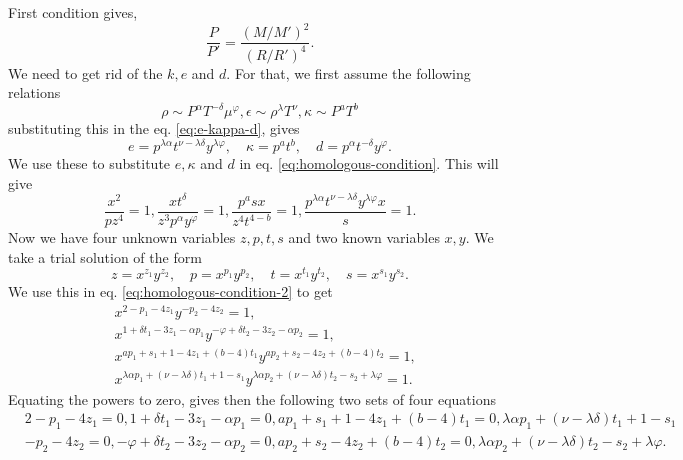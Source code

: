 \documentclass{revtex4-2}
\begin{document}
First condition gives,
\begin{equation}
  \label{eq:pressure}
  \frac{P}{P'} = \frac{(M/M')^2}{(R/R')^4}.
\end{equation}
We need to get rid of the $k, e$ and $d$. For that, we first assume the following relations
\begin{equation}
  \label{eq:micro-physics}
  \rho\sim P^\alpha T^{-\delta}\mu^\varphi, \epsilon \sim \rho^\lambda T^\nu, \kappa \sim P^a T^b
\end{equation}
substituting this in the eq. \eqref{eq:e-kappa-d}, gives
\begin{equation}
  \label{eq:e-kappa-d-2}
  e = p^{\lambda\alpha} t^{\nu-\lambda\delta}y^{\lambda\varphi},\quad \kappa = p^a t^b,\quad d = p^\alpha t^{-\delta}y^\varphi. 
\end{equation}
We use these to substitute $e, \kappa$ and $d$ in eq. \eqref{eq:homologous-condition}. This will give
\begin{equation}
  \label{eq:homologous-condition-2}
  \frac{x^2}{pz^4} = 1, \frac{x t^\delta}{z^3 p^\alpha y^\varphi} = 1, \frac{p^a sx}{z^4 t^{4-b}} = 1, \frac{p^{\lambda\alpha} t^{\nu-\lambda\delta}y^{\lambda\varphi} x}{s} = 1.
\end{equation}
Now we have four unknown variables $z, p, t, s$ and two known variables $x, y$. We take a trial solution of the form
\begin{equation}
  \label{eq:trial}
  z = x^{z_1}y^{z_2},\quad p = x^{p_1}y^{p_2},\quad t = x^{t_1}y^{t_2},\quad s = x^{s_1}y^{s_2}.
\end{equation}
We use this in eq. \eqref{eq:homologous-condition-2} to get
\begin{equation}
  \label{eq:eq-set-1}
  \begin{aligned}
    & x^{2 - p_1 - 4z_1}y^{- p_2 - 4z_2} = 1,\\
    & x^{1 + \delta t_1 - 3 z_1 - \alpha p_1}y^{-\varphi + \delta t_2 - 3 z_2 - \alpha p_2} = 1,\\
    & x^{ap_1 + s_1 + 1 - 4z_1 + (b-4)t_1}y^{ap_2 + s_2 - 4 z_2 + (b-4)t_2} = 1,\\
    & x^{\lambda\alpha p_1 + (\nu-\lambda\delta) t_1 + 1 - s_1}y^{\lambda\alpha p_2 + (\nu-\lambda\delta) t_2 - s_2 + \lambda\varphi} = 1.
\end{aligned}
\end{equation}
Equating the powers to zero, gives then the following two sets of four equations
\begin{equation}
  \label{eq:eq-set-2}
  \begin{aligned}
    & 2 - p_1 - 4z_1 = 0, 1 + \delta t_1 - 3 z_1 - \alpha p_1 = 0, ap_1 + s_1 + 1 - 4z_1 + (b-4)t_1 = 0, \lambda\alpha p_1 + (\nu-\lambda\delta) t_1 + 1 - s_1\\
    & - p_2 - 4z_2 = 0, -\varphi + \delta t_2 - 3 z_2 - \alpha p_2 = 0, ap_2 + s_2 - 4 z_2 + (b-4)t_2 = 0, \lambda\alpha p_2 + (\nu-\lambda\delta) t_2 - s_2 + \lambda\varphi.
  \end{aligned}
\end{equation}
\end{document}
